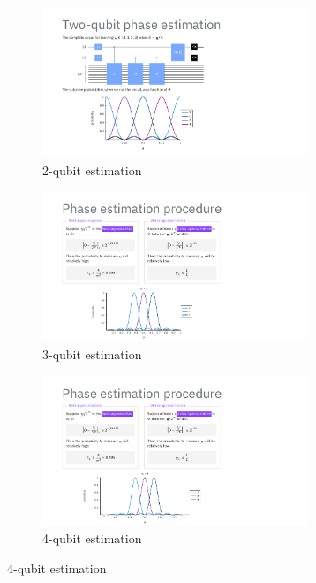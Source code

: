 \documentclass[msc,oneside]{ubcthesis}
\begin{document}
\begin{figure}[ht]
	\centering
	\begin{subfigure}[b]{\linewidth}
		\centering
		\includegraphics[height=4.5cm, trim={2.9cm 0.4cm 6.9cm 5.2cm}, clip]{phase-lecture/18_Phase-estimation-lecture-slides}
		\caption{2-qubit estimation}
		\label{fig:image1}
	\end{subfigure}
	
	\vspace{1ex} %
	
	\begin{subfigure}[b]{\linewidth}
		\centering
		\includegraphics[height=4.5cm, trim={2.9cm 0.15cm 6.9cm 5.95cm}, clip]{phase-lecture/27_Phase-estimation-lecture-slides}
		\caption{3-qubit estimation}
		\label{fig:image2}
	\end{subfigure}
	
	\vspace{1ex} %
	
	\begin{subfigure}[b]{\linewidth}
		\centering
		\includegraphics[height=4.5cm, trim={2.4cm 0.15cm 6.4cm 5.95cm}, clip]{phase-lecture/28_Phase-estimation-lecture-slides}
		\caption{4-qubit estimation}
		\label{fig:image3}
	\end{subfigure}
	

\end{figure}
\end{document}
